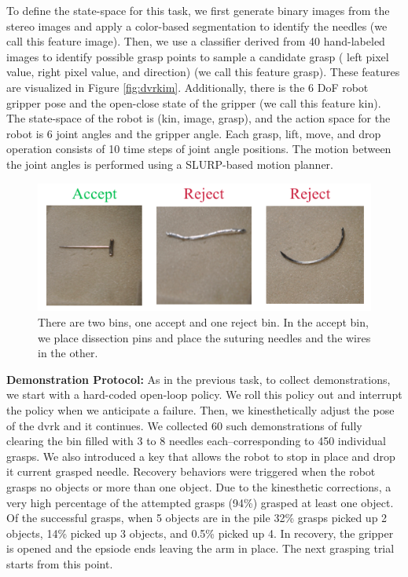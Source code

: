 To define the state-space for this task, we first generate binary images from the stereo images and apply a color-based segmentation to identify the needles (we call this feature \textsf{image}).
Then, we use a classifier derived from 40 hand-labeled images to identify possible grasp points to sample a candidate grasp ( left pixel value, right pixel value, and direction) (we call this feature \textsf{grasp}). 
These features are visualized in Figure \ref{fig:dvrkim}.
Additionally, there is the 6 DoF robot gripper pose and the open-close state of the gripper (we call this feature \textsf{kin}).
The state-space of the robot is (\textsf{kin}, \textsf{image}, \textsf{grasp}), and the action space for the robot is 6 joint angles and the gripper angle.
Each grasp, lift, move, and drop operation consists of 10 time steps of joint angle positions. The motion between the joint angles is performed using a SLURP-based motion planner.

\begin{figure}
    \centering
    \includegraphics[width=\textwidth]{ddco-experiments/bin-picking-cats.png}
    \caption{There are two bins, one accept and one reject bin. In the accept bin, we place dissection pins and place the suturing needles and the wires in the other. \label{fig:dvrkcats}}
\end{figure}

\vspace{0.5em} \noindent \textbf{Demonstration Protocol: } As in the previous task, to collect demonstrations, we start with a hard-coded open-loop policy.
We roll this policy out and interrupt the policy when we anticipate a failure.
Then, we kinesthetically adjust the pose of the dvrk and it continues.
We collected 60 such demonstrations of fully clearing the bin filled with 3 to 8 needles each--corresponding to 450 individual grasps.
We also introduced a key that allows the robot to stop in place and drop it current grasped needle.
Recovery behaviors were triggered when the robot grasps no objects or more than one object.
Due to the kinesthetic corrections, a very high percentage of the attempted grasps (94\%) grasped at least one object. 
Of the successful grasps, when 5 objects are in the pile 32\% grasps picked up 2 objects, 14\% picked up 3 objects, and 0.5\% picked up 4.
In recovery, the gripper is opened and the epsiode ends leaving the arm in place.
The next grasping trial starts from this point.


